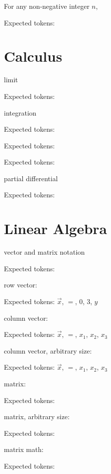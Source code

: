 \documentclass{article}
\begin{document}
\hrulefill


For any non-negative integer $n$,

Expected tokens: 

\hrulefill


\section{Calculus}
limit

Expected tokens: 

\hrulefill


integration

Expected tokens: 

\hrulefill



Expected tokens: 

\hrulefill



Expected tokens: 

\hrulefill


partial differential

Expected tokens: 

\hrulefill


\section{Linear Algebra}
vector and matrix notation
    
Expected tokens: 

\hrulefill



row vector:

Expected tokens: $\vec{x}$, $=$, $0$, $3$, $y$

\hrulefill


column vector:

Expected tokens: $\vec{x}$, $=$, $x_1$, $x_2$, $x_3$

\hrulefill


column vector, arbitrary size:

Expected tokens: $\vec{x}$, $=$, $x_1$, $x_2$, $x_3$

\hrulefill



matrix:

Expected tokens: 

\hrulefill


matrix, arbitrary size:

Expected tokens: 

\hrulefill


matrix math:

Expected tokens: 

\hrulefill
\end{document}
